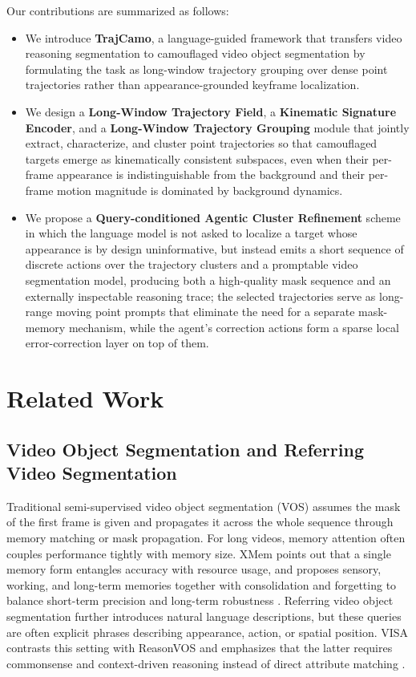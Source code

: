 \documentclass[11pt]{article}
\begin{document}
Our contributions are summarized as follows:
\begin{itemize}
	\item We introduce \textbf{TrajCamo}, a language-guided framework that transfers video reasoning segmentation to camouflaged video object segmentation by formulating the task as long-window trajectory grouping over dense point trajectories rather than appearance-grounded keyframe localization.
	\item We design a \textbf{Long-Window Trajectory Field}, a \textbf{Kinematic Signature Encoder}, and a \textbf{Long-Window Trajectory Grouping} module that jointly extract, characterize, and cluster point trajectories so that camouflaged targets emerge as kinematically consistent subspaces, even when their per-frame appearance is indistinguishable from the background and their per-frame motion magnitude is dominated by background dynamics.
	\item We propose a \textbf{Query-conditioned Agentic Cluster Refinement} scheme in which the language model is not asked to localize a target whose appearance is by design uninformative, but instead emits a short sequence of discrete actions over the trajectory clusters and a promptable video segmentation model, producing both a high-quality mask sequence and an externally inspectable reasoning trace; the selected trajectories serve as long-range moving point prompts that eliminate the need for a separate mask-memory mechanism, while the agent's correction actions form a sparse local error-correction layer on top of them.
\end{itemize}



\section{Related Work}

\subsection{Video Object Segmentation and Referring Video Segmentation}
Traditional semi-supervised video object segmentation (VOS) assumes the mask of the first frame is given and propagates it across the whole sequence through memory matching or mask propagation. For long videos, memory attention often couples performance tightly with memory size. XMem points out that a single memory form entangles accuracy with resource usage, and proposes sensory, working, and long-term memories together with consolidation and forgetting to balance short-term precision and long-term robustness \cite{xmem}. Referring video object segmentation further introduces natural language descriptions, but these queries are often explicit phrases describing appearance, action, or spatial position. VISA contrasts this setting with ReasonVOS and emphasizes that the latter requires commonsense and context-driven reasoning instead of direct attribute matching \cite{visa}.
\end{document}
